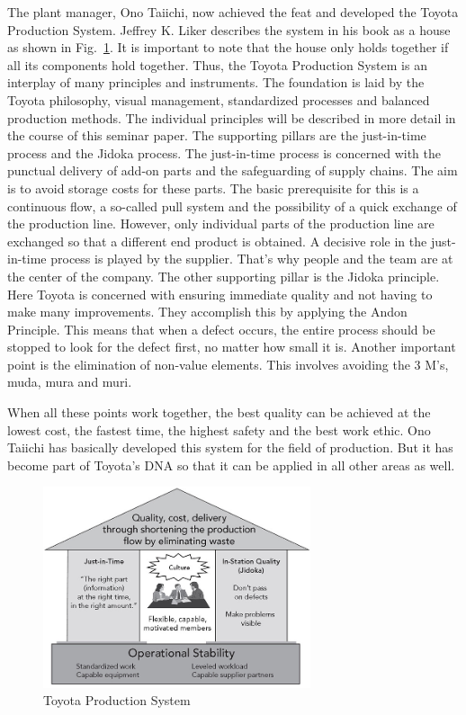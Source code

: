 \documentclass[a4paper,11pt]{article}
\begin{document}
The plant manager, Ono Taiichi, now achieved the feat and developed the Toyota
Production System. Jeffrey K. Liker describes the system in his book as a
house as shown in Fig.~\ref{TPS}. It is important to note that the house only
holds together if all its components hold together. Thus, the Toyota
Production System is an interplay of many principles and instruments. The
foundation is laid by the Toyota philosophy, visual management, standardized
processes and balanced production methods. The individual principles will be
described in more detail in the course of this seminar paper. The supporting
pillars are the just-in-time process and the Jidoka process. The just-in-time
process is concerned with the punctual delivery of add-on parts and the
safeguarding of supply chains. The aim is to avoid storage costs for these
parts. The basic prerequisite for this is a continuous flow, a so-called pull
system and the possibility of a quick exchange of the production
line. However, only individual parts of the production line are exchanged so
that a different end product is obtained. A decisive role in the just-in-time
process is played by the supplier. That's why people and the team are at the
center of the company. The other supporting pillar is the Jidoka
principle. Here Toyota is concerned with ensuring immediate quality and not
having to make many improvements. They accomplish this by applying the Andon
Principle. This means that when a defect occurs, the entire process should be
stopped to look for the defect first, no matter how small it is. Another
important point is the elimination of non-value elements. This involves
avoiding the 3 M's, muda, mura and muri.
    
When all these points work together, the best quality can be achieved at the
lowest cost, the fastest time, the highest safety and the best work ethic. Ono
Taiichi has basically developed this system for the field of production. But
it has become part of Toyota's DNA so that it can be applied in all other
areas as well.

\begin{figure}[h] 
  \centering
     \includegraphics[width=0.7\textwidth]{TPS.png}
  \caption{Toyota Production System \cite{Abbildung-1}}
  \label{TPS}
\end{figure}
\end{document}
